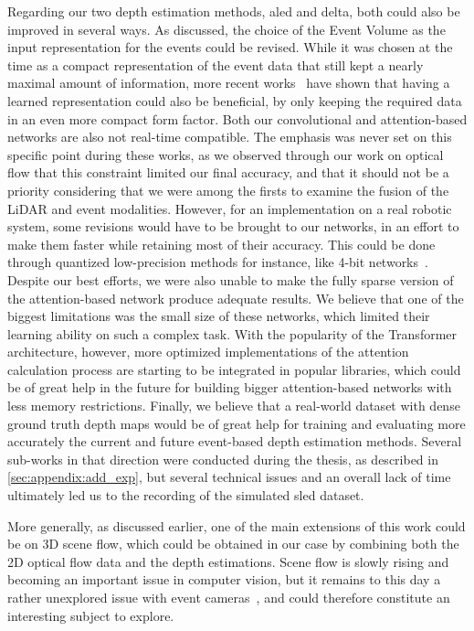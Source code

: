 Regarding our two depth estimation methods, \acrshort{aled} and \acrshort{delta}, both could also be improved in several ways. As discussed, the choice of the Event Volume as the input representation for the events could be revised. While it was chosen at the time as a compact representation of the event data that still kept a nearly maximal amount of information, more recent works~\cite{Zubic2023FromCC} have shown that having a learned representation could also be beneficial, by only keeping the required data in an even more compact form factor. Both our convolutional and attention-based networks are also not real-time compatible. The emphasis was never set on this specific point during these works, as we observed through our work on optical flow that this constraint limited our final accuracy, and that it should not be a priority considering that we were among the firsts to examine the fusion of the LiDAR and event modalities. However, for an implementation on a real robotic system, some revisions would have to be brought to our networks, in an effort to make them faster while retaining most of their accuracy. This could be done through quantized low-precision methods for instance, like 4-bit networks~\cite{Trusov2020FastIO,Dettmers2023QLoRAEF}. Despite our best efforts, we were also unable to make the fully sparse version of the attention-based network produce adequate results. We believe that one of the biggest limitations was the small size of these networks, which limited their learning ability on such a complex task. With the popularity of the Transformer architecture, however, more optimized implementations of the attention calculation process are starting to be integrated in popular libraries, which could be of great help in the future for building bigger attention-based networks with less memory restrictions. Finally, we believe that a real-world dataset with dense ground truth depth maps would be of great help for training and evaluating more accurately the current and future event-based depth estimation methods. Several sub-works in that direction were conducted during the thesis, as described in \cref{sec:appendix:add_exp}, but several technical issues and an overall lack of time ultimately led us to the recording of the simulated \acrshort{sled} dataset.

More generally, as discussed earlier, one of the main extensions of this work could be on 3D scene flow, which could be obtained in our case by combining both the 2D optical flow data and the depth estimations. Scene flow is slowly rising and becoming an important issue in computer vision, but it remains to this day a rather unexplored issue with event cameras~\cite{Carneiro2014AsynchronousE3,Ieng2017EventBased3M}, and could therefore constitute an interesting subject to explore.

